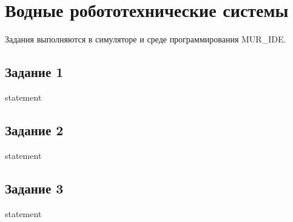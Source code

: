 \chapter{Водные робототехнические системы}

Задания выполняются в симуляторе и среде программирования MUR\_IDE.

\section{Задание 1}
{statement}

\section{Задание 2}
{statement}

\section{Задание 3}
{statement}